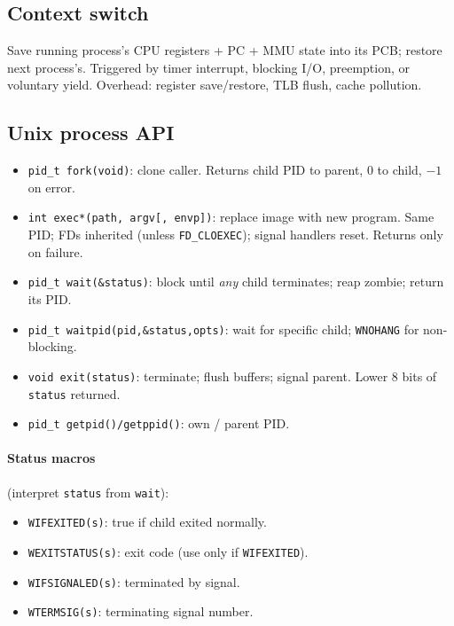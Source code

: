 \subsection{Context switch}
Save running process's CPU registers + PC + MMU state into its PCB; restore next process's. Triggered by \textcolor{Bittersweet}{timer interrupt}, blocking I/O, preemption, or voluntary yield. \textcolor{Bittersweet}{Overhead}: register save/restore, TLB flush, cache pollution.

\subsection{Unix process API}
\begin{itemize}
  \item \texttt{pid\_t \textcolor{Bittersweet}{fork}(void)}: clone caller. Returns child PID to parent, $0$ to child, $-1$ on error.
  \item \texttt{int \textcolor{Bittersweet}{exec*}(path, argv[, envp])}: replace image with new program. Same PID; FDs inherited (unless \texttt{FD\_CLOEXEC}); signal handlers reset. Returns only on failure.
  \item \texttt{pid\_t \textcolor{Bittersweet}{wait}(\&status)}: block until \emph{any} child terminates; reap zombie; return its PID.
  \item \texttt{pid\_t \textcolor{Bittersweet}{waitpid}(pid,\&status,opts)}: wait for specific child; \texttt{WNOHANG} for non-blocking.
  \item \texttt{void \textcolor{Bittersweet}{exit}(status)}: terminate; flush buffers; signal parent. Lower 8 bits of \texttt{status} returned.
  \item \texttt{pid\_t \textcolor{Bittersweet}{getpid}()/\textcolor{Bittersweet}{getppid}()}: own / parent PID.
\end{itemize}

\paragraph{Status macros} (interpret \texttt{status} from \texttt{wait}):
\begin{itemize}
  \item \texttt{\textcolor{Bittersweet}{WIFEXITED}(s)}: true if child exited normally.
  \item \texttt{\textcolor{Bittersweet}{WEXITSTATUS}(s)}: exit code (use only if \texttt{WIFEXITED}).
  \item \texttt{\textcolor{Bittersweet}{WIFSIGNALED}(s)}: terminated by signal.
  \item \texttt{\textcolor{Bittersweet}{WTERMSIG}(s)}: terminating signal number.
\end{itemize}

